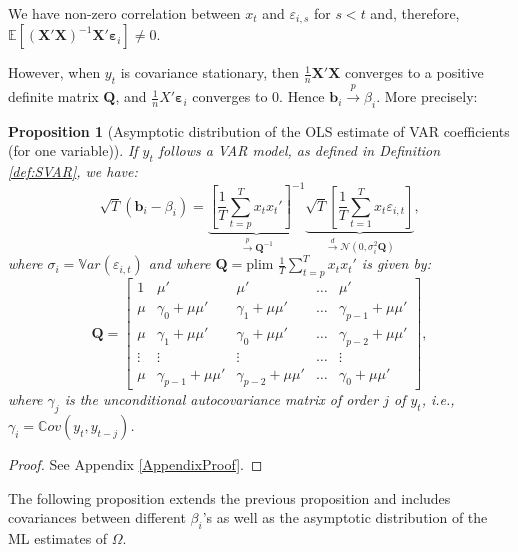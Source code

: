 \documentclass[
  12pt,
]{book}
\newtheorem{proposition}{Proposition}[chapter]
\theoremstyle{definition}
\theoremstyle{definition}
\theoremstyle{definition}
\theoremstyle{definition}
\theoremstyle{remark}
\begin{document}
We have non-zero correlation between \(x_t\) and \(\varepsilon_{i,s}\) for \(s<t\) and, therefore, \(\mathbb{E}[(\mathbf{X}'\mathbf{X})^{-1}\mathbf{X}'\boldsymbol\varepsilon_i] \ne 0\).

However, when \(y_t\) is covariance stationary, then \(\frac{1}{n}\mathbf{X}'\mathbf{X}\) converges to a positive definite matrix \(\mathbf{Q}\), and \(\frac{1}{n}X'\boldsymbol\varepsilon_i\) converges to 0. Hence \(\mathbf{b}_i \overset{p}{\rightarrow} \beta_i\). More precisely:

\begin{proposition}[Asymptotic distribution of the OLS estimate of VAR coefficients (for one variable)]
\protect\hypertarget{prp:OLSVAR}{}\label{prp:OLSVAR}If \(y_t\) follows a VAR model, as defined in Definition \ref{def:SVAR}, we have:
\[
\sqrt{T}(\mathbf{b}_i-\beta_i) =  \underbrace{\left[\frac{1}{T}\sum_{t=p}^T x_t x_t' \right]^{-1}}_{\overset{p}{\rightarrow} \mathbf{Q}^{-1}}
\underbrace{\sqrt{T} \left[\frac{1}{T}\sum_{t=1}^T x_t\varepsilon_{i,t} \right]}_{\overset{d}{\rightarrow} \mathcal{N}(0,\sigma_i^2\mathbf{Q})},
\]
where \(\sigma_i = \mathbb{V}ar(\varepsilon_{i,t})\) and where \(\mathbf{Q} = \mbox{plim }\frac{1}{T}\sum_{t=p}^T x_t x_t'\) is given by:
\begin{equation}
\mathbf{Q} = \left[
\begin{array}{ccccc}
1 & \mu' &\mu' & \dots & \mu' \\
\mu & \gamma_0 + \mu\mu' & \gamma_1 + \mu\mu' & \dots & \gamma_{p-1} + \mu\mu'\\
\mu & \gamma_1 + \mu\mu' & \gamma_0 + \mu\mu' & \dots & \gamma_{p-2} + \mu\mu'\\
\vdots &\vdots &\vdots &\dots &\vdots \\
\mu & \gamma_{p-1} + \mu\mu' & \gamma_{p-2} + \mu\mu' & \dots & \gamma_{0} + \mu\mu'
\end{array}
\right],
\label{eq:Qols}
\end{equation}
where \(\gamma_j\) is the unconditional autocovariance matrix of order \(j\) of \(y_t\), i.e., \(\gamma_i = \mathbb{C}ov(y_{t},y_{t-j})\).
\end{proposition}

\begin{proof}
See Appendix \ref{AppendixProof}.
\end{proof}

The following proposition extends the previous proposition and includes covariances between different \(\beta_i\)'s as well as the asymptotic distribution of the ML estimates of \(\Omega\).
\end{document}
